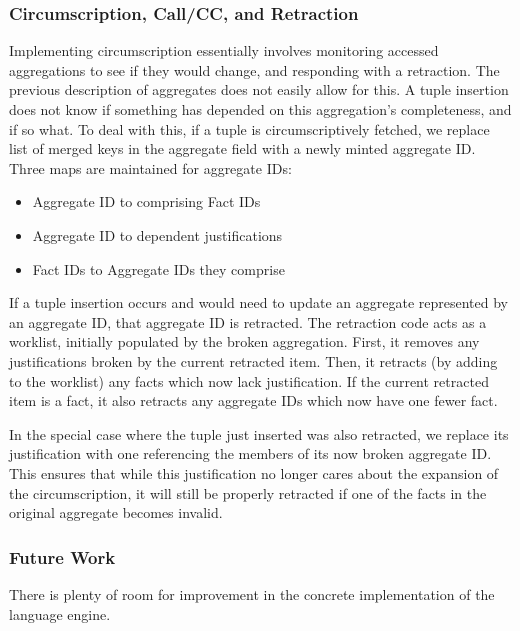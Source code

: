 \subsubsection{Circumscription, Call/CC, and Retraction}
Implementing circumscription essentially involves monitoring accessed aggregations to see if they would change, and responding with a retraction.
The previous description of aggregates does not easily allow for this.
A tuple insertion does not know if something has depended on this aggregation's completeness, and if so what.
To deal with this, if a tuple is circumscriptively fetched, we replace list of merged keys in the aggregate field with a newly minted aggregate ID.
Three maps are maintained for aggregate IDs:
\begin{itemize}
	\item Aggregate ID to comprising Fact IDs
	\item Aggregate ID to dependent justifications
	\item Fact IDs to Aggregate IDs they comprise
\end{itemize}

If a tuple insertion occurs and would need to update an aggregate represented by an aggregate ID, that aggregate ID is retracted.
The retraction code acts as a worklist, initially populated by the broken aggregation.
First, it removes any justifications broken by the current retracted item.
Then, it retracts (by adding to the worklist) any facts which now lack justification.
If the current retracted item is a fact, it also retracts any aggregate IDs which now have one fewer fact.

In the special case where the tuple just inserted was also retracted, we replace its justification with one referencing the members of its now broken aggregate ID.
This ensures that while this justification no longer cares about the expansion of the circumscription, it will still be properly retracted if one of the facts in the original aggregate becomes invalid.


\subsubsection{Future Work}
There is plenty of room for improvement in the concrete implementation of the language engine.

